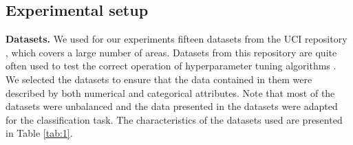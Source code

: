 \documentclass[iicol]{sn-jnl}
\theoremstyle{thmstyleone}%
\theoremstyle{thmstyletwo}%
\theoremstyle{thmstylethree}%
\begin{document}
\subsection{Experimental setup}

\textbf{Datasets.} We used for our experiments fifteen datasets from the UCI repository \citep{UCI}, which covers a large number of areas. Datasets from this repository are quite often used to test the correct operation of hyperparameter tuning algorithms \citep{Joy2020,Wang2021,Wu2023}. We selected the datasets to ensure that the data contained in them were described by both numerical and categorical attributes. Note that most of the datasets were unbalanced and the data presented in the datasets were adapted for the classification task.  The characteristics of the datasets used are presented in Table \ref{tab:1}.
\end{document}
